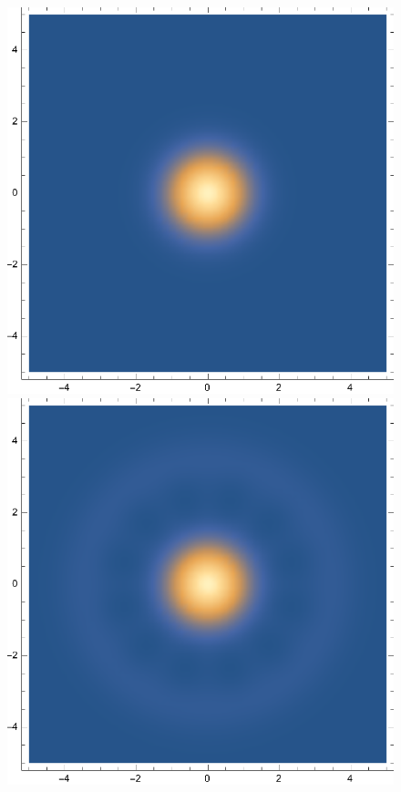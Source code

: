 \documentclass{article}
\theoremstyle{definition}
\begin{document}
\begin{enumerate}[label=\alph*)]
	\begin{figure}[!htb]
	\centering
	\begin{minipage}{.24\textwidth}
  	\centering
  	\includegraphics[width=.7\linewidth]{figures/1-phi-0-theta-0.eps}
	\end{minipage}%
	\begin{minipage}{.24\textwidth}
  	\centering
  	\includegraphics[width=.7\linewidth]{figures/1-phi-0-theta-pi3.eps}
	\end{minipage}
	\begin{minipage}{.24\textwidth}
  	\centering

\end{minipage}
\end{figure}
\end{enumerate}
\end{document}
